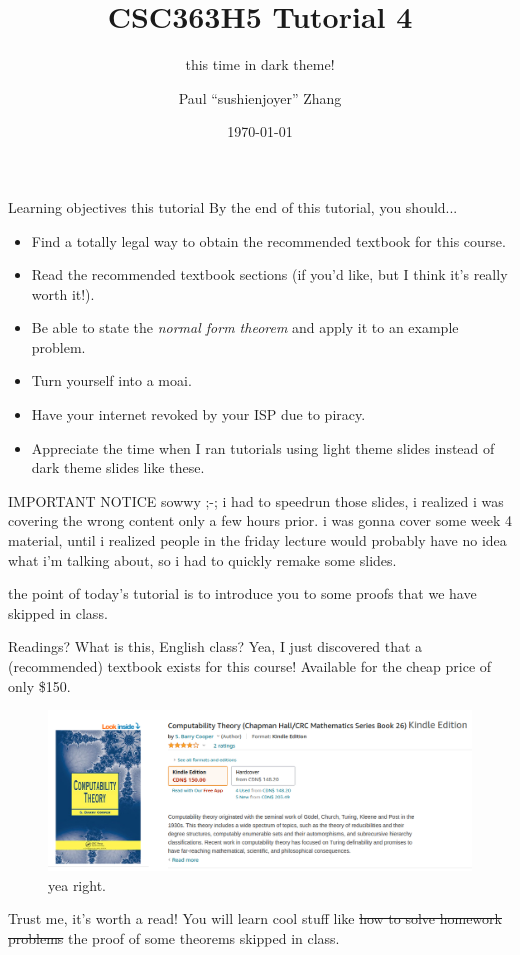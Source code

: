 \documentclass{beamer}
\title{CSC363H5 Tutorial 4}
\subtitle{this time in dark theme!}
\date{\today}
\author{Paul ``sushi{\textunderscore}enjoyer'' Zhang}
\institute{University of Chungi}
\begin{document}
\maketitle

\begin{frame}{Learning objectives this tutorial}
By the end of this tutorial, you should...
\begin{itemize}
\item Find a totally legal way to obtain the recommended textbook for this course.
\item Read the recommended textbook sections (if you'd like, but I think it's really worth it!).
\item Be able to state the \textit{normal form theorem} and apply it to an example problem.
\item Turn yourself into a moai. \emojimoyai \emojimoyai \emojimoyai
\item Have your internet revoked by your ISP due to piracy.
\item Appreciate the time when I ran tutorials using light theme slides instead of dark theme slides like these.
\end{itemize}
\end{frame}

\begin{frame}{IMPORTANT NOTICE}
sowwy ;-; i had to speedrun those slides, i realized i was covering the wrong content only a few hours prior. i was gonna cover some week 4 material, until i realized people in the friday lecture would probably have no idea what i'm talking about, so i had to quickly remake some slides.

the point of today's tutorial is to introduce you to some proofs that we have skipped in class. 
\end{frame}

\begin{frame}{Readings? What is this, English class?}
Yea, I just discovered that a (recommended) textbook exists for this course! Available for the cheap price of only \$150.
\begin{figure}[placement]
\centering
\includegraphics[scale=0.3]{img/book.png}
yea right.
\end{figure}
Trust me, it's worth a read! You will learn cool stuff like \sout{how to solve homework problems} the proof of some theorems skipped in class.

\end{frame}
\end{document}
